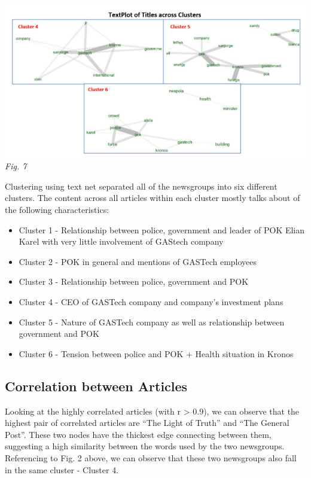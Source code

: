 \documentclass{acm_proc_article-sp}
\providecommand{\tightlist}{%
  \setlength{\itemsep}{0pt}\setlength{\parskip}{0pt}}
\begin{document}
\includegraphics{img/image13.png} \emph{Fig. 7}

Clustering using text net separated all of the newsgroups into six
different clusters. The content across all articles within each cluster
mostly talks about of the following characteristics:

\begin{itemize}
\tightlist
\item
  Cluster 1 - Relationship between police, government and leader of POK
  Elian Karel with very little involvement of GAStech company
\item
  Cluster 2 - POK in general and mentions of GASTech employees
\item
  Cluster 3 - Relationship between police, government and POK
\item
  Cluster 4 - CEO of GASTech company and company's investment plans
\item
  Cluster 5 - Nature of GASTech company as well as relationship between
  government and POK
\item
  Cluster 6 - Tension between police and POK + Health situation in
  Kronos
\end{itemize}

\hypertarget{correlation-between-articles}{%
\subsection{Correlation between
Articles}\label{correlation-between-articles}}

Looking at the highly correlated articles (with r \textgreater{} 0.9),
we can observe that the highest pair of correlated articles are ``The
Light of Truth'' and ``The General Post''. These two nodes have the
thickest edge connecting between them, suggesting a high similarity
between the words used by the two newsgroups. Referencing to Fig. 2
above, we can observe that these two newsgroups also fall in the same
cluster - Cluster 4.
\end{document}

